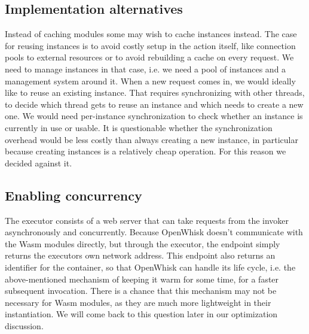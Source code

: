 \subsection{Implementation alternatives}
Instead of caching modules some may wish to cache instances instead. The case for reusing instances is to avoid costly setup in the action itself, like connection pools to external resources or to avoid rebuilding a cache on every request.
We need to manage instances in that case, i.e. we need a pool of instances and a management system around it. When a new request comes in, we would ideally like to reuse an existing instance. That requires synchronizing with other threads, to decide which thread gets to reuse an instance and which needs to create a new one. We would need per-instance synchronization to check whether an instance is currently in use or usable. It is questionable whether the synchronization overhead would be less costly than always creating a new instance, in particular because creating instances is a relatively cheap operation. For this reason we decided against it.





\subsection{Enabling concurrency}

The executor consists of a web server that can take requests from the invoker asynchronously and concurrently. Because OpenWhisk doesn't communicate with the Wasm modules directly, but through the executor, the  endpoint simply returns the executors own network address. This endpoint also returns an identifier for the container, so that OpenWhisk can handle its life cycle, i.e. the above-mentioned mechanism of keeping it warm for some time, for a faster subsequent invocation. There is a chance that this mechanism may not be necessary for Wasm modules, as they are much more lightweight in their instantiation. We will come back to this question later in our optimization discussion.


